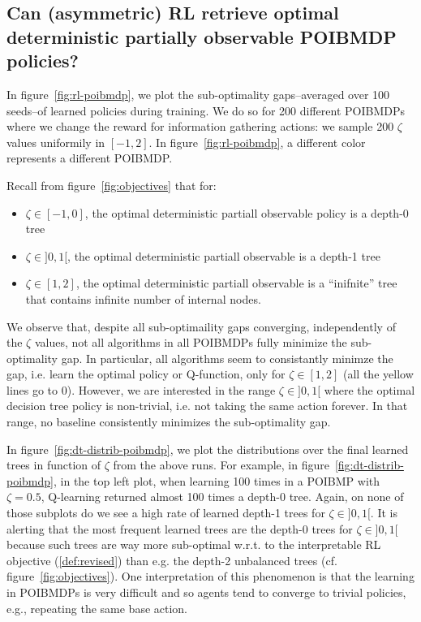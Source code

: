 \subsection{Can (asymmetric) RL retrieve optimal deterministic partially observable POIBMDP policies?}

In figure~\ref{fig:rl-poibmdp}, we plot the sub-optimality gaps--averaged over 100 seeds--of learned policies during training.
We do so for 200 different POIBMDPs where we change the reward for information gathering actions: we sample 200 $\zeta$ values uniformily in $[-1, 2]$.
In figure~\ref{fig:rl-poibmdp}, a different color represents a different POIBMDP.

Recall from figure~\ref{fig:objectives} that for:
\begin{itemize}
    \item $\zeta\in [-1, 0]$, the optimal deterministic partiall observable policy is a depth-0 tree
    \item $\zeta\in ]0, 1[$, the optimal deterministic partiall observable is a depth-1 tree
    \item $\zeta\in [1, 2]$, the optimal deterministic partiall observable is a ``inifnite'' tree that contains infinite number of internal nodes.
\end{itemize}
We observe that, despite all sub-optimaility gaps converging, independently of the $\zeta$ values, not all algorithms in all POIBMDPs fully minimize the sub-optimality gap.
In particular, all algorithms seem to consistantly minimze the gap, i.e. learn the optimal policy or Q-function, only for $\zeta \in [1, 2]$ (all the yellow lines go to 0).
However, we are interested in the range $\zeta\in ]0, 1[$ where the optimal decision tree policy is non-trivial, i.e. not taking the same action forever.
In that range, no baseline consistently minimizes the sub-optimality gap.


In figure~\ref{fig:dt-distrib-poibmdp}, we plot the distributions over the final learned trees in function of $\zeta$ from the above runs.
For example, in figure~\ref{fig:dt-distrib-poibmdp}, in the top left plot, when learning 100 times in a POIBMP with $\zeta=0.5$, Q-learning returned almost 100 times a depth-0 tree.
Again, on none of those subplots do we see a high rate of learned depth-1 trees for $\zeta\in ]0, 1[$.
It is alerting that the most frequent learned trees are the depth-0 trees for $\zeta\in ]0, 1[$ because such trees are way more sub-optimal w.r.t. to the interpretable RL objective (\ref{def:revised}) than e.g. the depth-2 unbalanced trees (cf. figure~\ref{fig:objectives}).  
One interpretation of this phenomenon is that the learning in POIBMDPs is very difficult and so agents tend to converge to trivial policies, e.g., repeating the same base action.

